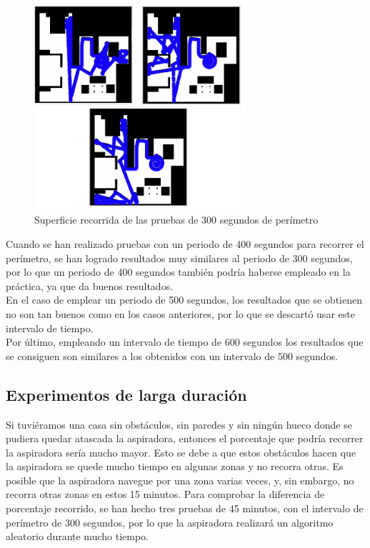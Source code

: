 \begin{figure}[H]
  \begin{center}
    \includegraphics[width=0.7\textwidth]{figures/Vacuum/Referee300.png}
		\caption{Superficie recorrida de las pruebas de 300 segundos de perímetro}
		\label{fig.Referee300}
		\end{center}
\end{figure}

Cuando se han realizado pruebas con un periodo de 400 segundos para recorrer el perímetro, se han logrado resultados muy similares al periodo de 300 segundos, por lo que un periodo de 400 segundos también podría haberse empleado en la práctica, ya que da buenos resultados. \\

En el caso de emplear un periodo de 500 segundos, los resultados que se obtienen no son tan buenos como en los casos anteriores, por lo que se descartó usar este intervalo de tiempo. \\

Por último, empleando un intervalo de tiempo de 600 segundos los resultados que se consiguen son similares a los obtenidos con un intervalo de 500 segundos. \\


\subsection{Experimentos de larga duración}
Si tuviéramos una casa sin obstáculos, sin paredes y sin ningún hueco donde se pudiera quedar atascada la aspiradora, entonces el porcentaje que podría recorrer la aspiradora sería mucho mayor. Esto se debe a que estos obstáculos hacen que la aspiradora se quede mucho tiempo en algunas zonas y no recorra otras. Es posible que la aspiradora navegue por una zona varias veces, y, sin embargo, no recorra otras zonas en estos 15 minutos. Para comprobar la diferencia de porcentaje recorrido, se han hecho tres pruebas de 45 minutos, con el intervalo de perímetro de 300 segundos, por lo que la aspiradora realizará un algoritmo aleatorio durante mucho tiempo. \\

